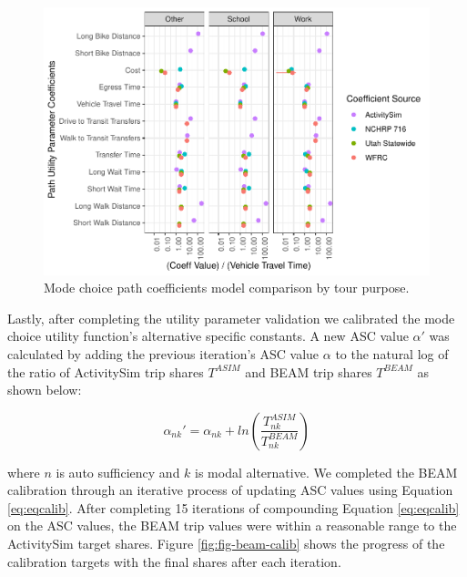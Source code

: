 \documentclass[fancy, masters]{byuthesis}
\begin{document}
\begin{figure}

{\centering \includegraphics{thesis_files/figure-latex/coef-1} 

}

\caption{Mode choice path coefficients model comparison by tour purpose.}\label{fig:coef}
\end{figure}

Lastly, after completing the utility parameter validation we calibrated the mode choice utility function's alternative specific constants. A new ASC value \(\alpha'\) was calculated by adding the previous iteration's ASC value \(\alpha\) to the natural log of the ratio of ActivitySim trip shares \(T^{ASIM}\) and BEAM trip shares \(T^{BEAM}\) as shown below:

\begin{equation}
  \alpha_{nk}' = \alpha_{nk} + ln(\frac{T_{nk}^{ASIM}}{T_{nk}^{BEAM}}) \label{eq:eqcalib}
\end{equation}

where \(n\) is auto sufficiency and \(k\) is modal alternative. We completed the BEAM calibration through an iterative process of updating ASC values using Equation \eqref{eq:eqcalib}. After completing 15 iterations of compounding Equation \eqref{eq:eqcalib} on the ASC values, the BEAM trip values were within a reasonable range to the ActivitySim target shares. Figure \ref{fig:fig-beam-calib} shows the progress of the calibration targets with the final shares after each iteration.
\end{document}

